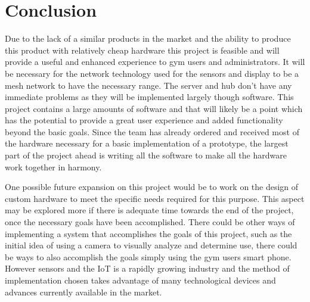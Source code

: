 \documentclass[PPFS.tex]{template/subfiles}
\begin{document}
\section{Conclusion}
Due to the lack of a similar products in the market and the ability to produce this product with relatively cheap hardware this project is feasible and will provide a useful and enhanced experience to gym users and administrators. It will be necessary for the network technology used for the sensors and display to be a mesh network to have the necessary range. The server and hub don't have any immediate problems as they will be implemented largely though software. This project contains a large amounts of software and that will likely be a point which has the potential to provide a great user experience and added functionality beyond the basic goals. Since the team has already ordered and received most of the hardware necessary for a basic implementation of a prototype, the largest part of the project ahead is writing all the software to make all the hardware work together in harmony. 

One possible future expansion on this project would be to work on the design of custom hardware to meet the specific needs required for this purpose. This aspect may be explored more if there is adequate time towards the end of the project, once the necessary goals have been accomplished. There could be other ways of implementing a system that accomplishes the goals of this project, such as the initial idea of using a camera to visually analyze and determine use, there could be ways to also accomplish the goals simply using the gym users smart phone. However sensors and the IoT is a rapidly growing industry and the method of implementation chosen takes advantage of many technological devices and advances currently available in the market. 
\end{document}

